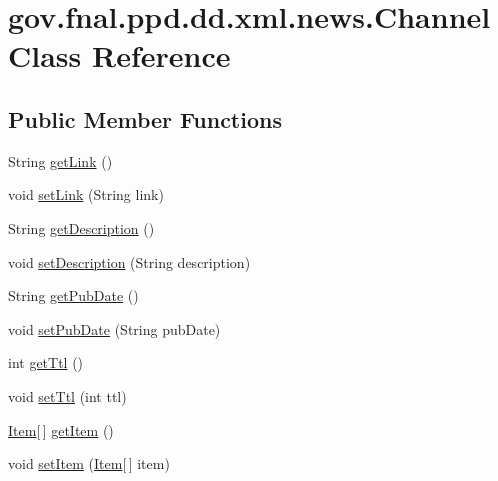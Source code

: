 \hypertarget{classgov_1_1fnal_1_1ppd_1_1dd_1_1xml_1_1news_1_1Channel}{\section{gov.\-fnal.\-ppd.\-dd.\-xml.\-news.\-Channel Class Reference}
\label{classgov_1_1fnal_1_1ppd_1_1dd_1_1xml_1_1news_1_1Channel}
}
\subsection*{Public Member Functions}
\begin{DoxyCompactItemize}
\item 
String \hyperlink{classgov_1_1fnal_1_1ppd_1_1dd_1_1xml_1_1news_1_1Channel_a7fdf8c541c2b8db655bef435a3a1256b}{get\-Link} ()
\item 
void \hyperlink{classgov_1_1fnal_1_1ppd_1_1dd_1_1xml_1_1news_1_1Channel_af109c65ed930f1b2116d2de5dbfb42fe}{set\-Link} (String link)
\item 
String \hyperlink{classgov_1_1fnal_1_1ppd_1_1dd_1_1xml_1_1news_1_1Channel_ab77d2327090d0d493bedf37c5b591f20}{get\-Description} ()
\item 
void \hyperlink{classgov_1_1fnal_1_1ppd_1_1dd_1_1xml_1_1news_1_1Channel_a2ec67eb1b26c0d4454bb132995548bf9}{set\-Description} (String description)
\item 
String \hyperlink{classgov_1_1fnal_1_1ppd_1_1dd_1_1xml_1_1news_1_1Channel_a9b6e9c2bd616d3317f15277eca7a2f6c}{get\-Pub\-Date} ()
\item 
void \hyperlink{classgov_1_1fnal_1_1ppd_1_1dd_1_1xml_1_1news_1_1Channel_a5865fd17475a128c33c87ac3a8a1fced}{set\-Pub\-Date} (String pub\-Date)
\item 
int \hyperlink{classgov_1_1fnal_1_1ppd_1_1dd_1_1xml_1_1news_1_1Channel_afc19c9c6cd916bb18e88f32ff95af310}{get\-Ttl} ()
\item 
void \hyperlink{classgov_1_1fnal_1_1ppd_1_1dd_1_1xml_1_1news_1_1Channel_ab8c7ada1cdd7b39483404e8f99e2248e}{set\-Ttl} (int ttl)
\item 
\hyperlink{classgov_1_1fnal_1_1ppd_1_1dd_1_1xml_1_1news_1_1Item}{Item}\mbox{[}$\,$\mbox{]} \hyperlink{classgov_1_1fnal_1_1ppd_1_1dd_1_1xml_1_1news_1_1Channel_a326adc153e98c6cb6a5916c76339cf52}{get\-Item} ()
\item 
void \hyperlink{classgov_1_1fnal_1_1ppd_1_1dd_1_1xml_1_1news_1_1Channel_ad8c3dbeef99962204158635cffccaf26}{set\-Item} (\hyperlink{classgov_1_1fnal_1_1ppd_1_1dd_1_1xml_1_1news_1_1Item}{Item}\mbox{[}$\,$\mbox{]} item)

\end{DoxyCompactItemize}
